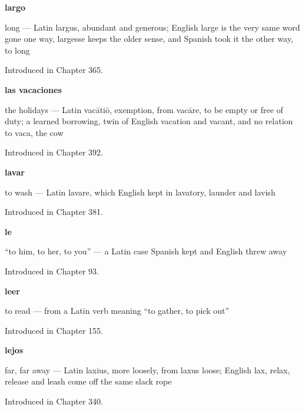 \noindent\begin{minipage}[t]{\linewidth}
\raggedright
\textbf{largo}\par
\small long — Latin largus, abundant and generous; English large is the very same word gone one way, largesse keeps the older sense, and Spanish took it the other way, to long\par
\footnotesize Introduced in Chapter 365.
\end{minipage}\par\medskip

\noindent\begin{minipage}[t]{\linewidth}
\raggedright
\textbf{las vacaciones}\par
\small the holidays — Latin vacātiō, exemption, from vacāre, to be empty or free of duty; a learned borrowing, twin of English vacation and vacant, and no relation to vaca, the cow\par
\footnotesize Introduced in Chapter 392.
\end{minipage}\par\medskip

\noindent\begin{minipage}[t]{\linewidth}
\raggedright
\textbf{lavar}\par
\small to wash — Latin lavare, which English kept in lavatory, launder and lavish\par
\footnotesize Introduced in Chapter 381.
\end{minipage}\par\medskip

\noindent\begin{minipage}[t]{\linewidth}
\raggedright
\textbf{le}\par
\small \textquotedblleft{}to him, to her, to you\textquotedblright{} — a Latin case Spanish kept and English threw away\par
\footnotesize Introduced in Chapter 93.
\end{minipage}\par\medskip

\noindent\begin{minipage}[t]{\linewidth}
\raggedright
\textbf{leer}\par
\small to read — from a Latin verb meaning \textquotedblleft{}to gather, to pick out\textquotedblright{}\par
\footnotesize Introduced in Chapter 155.
\end{minipage}\par\medskip

\noindent\begin{minipage}[t]{\linewidth}
\raggedright
\textbf{lejos}\par
\small far, far away — Latin laxius, more loosely, from laxus loose; English lax, relax, release and leash come off the same slack rope\par
\footnotesize Introduced in Chapter 340.
\end{minipage}\par\medskip

